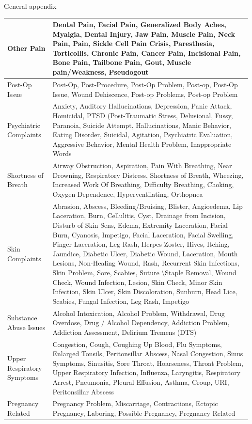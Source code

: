 \documentclass[,,nonblindrev]{informs}
\begin{document}
\begin{APPENDIX}{General appendix}
\begin{longtable}{|p{5cm}|p{12cm}|}
\hline
Other Pain & Dental Pain, Facial Pain, Generalized Body Aches, Myalgia, Dental Injury, Jaw Pain, Muscle Pain, Neck Pain, Pain, Sickle Cell Pain Crisis, Paresthesia, Torticollis, Chronic Pain, Cancer Pain, Incisional Pain, Bone Pain, Tailbone Pain, Gout, Muscle pain/Weakness, Pseudogout \\
\hline
Post-Op Issue & Post-Op, Post-Procedure, Post-Op Problem, Post-op, Post-Op Issue, Wound Dehiscence, Post-op Problems, Post-op Problem \\
\hline
Psychiatric Complaints & Anxiety, Auditory Hallucinations, Depression, Panic Attack, Homicidal, PTSD (Post-Traumatic Stress, Delusional, Fussy, Paranoia, Suicide Attempt, Hallucinations, Manic Behavior, Eating Disorder, Suicidal, Agitation, Psychiatric Evaluation, Aggressive Behavior, Mental Health Problem, Inappropriate Words \\
\hline
Shortness of Breath & Airway Obstruction, Aspiration, Pain With Breathing, Near Drowning, Respiratory Distress, Shortness of Breath, Wheezing, Increased Work Of Breathing, Difficulty Breathing, Choking, Oxygen Dependence, Hyperventilating, Orthopnea \\
\hline
Skin Complaints & Abrasion, Abscess, Bleeding/Bruising, Blister, Angioedema, Lip Laceration, Burn, Cellulitis, Cyst, Drainage from Incision, Disturb of Skin Sens, Edema, Extremity Laceration, Facial Burn, Cyanosis, Impetigo, Facial Laceration, Facial Swelling, Finger Laceration, Leg Rash, Herpes Zoster, Hives, Itching, Jaundice, Diabetic Ulcer, Diabetic Wound, Laceration, Mouth Lesions, Non-Healing Wound, Rash, Recurrent Skin Infections, Skin Problem, Sore, Scabies, Suture \textbackslash Staple Removal, Wound Check, Wound Infection, Lesion, Skin Check, Minor Skin Infection, Skin Ulcer, Skin Discoloration, Sunburn, Head Lice, Scabies, Fungal Infection, Leg Rash, Impetigo \\
\hline
Substance Abuse Issues & Alcohol Intoxication, Alcohol Problem, Withdrawal, Drug Overdose, Drug / Alcohol Dependency, Addiction Problem, Addiction Assessment, Delirium Tremens (DTS) \\
\hline
Upper Respiratory Symptoms & Congestion, Cough, Coughing Up Blood, Flu Symptoms, Enlarged Tonsils, Peritonsillar Abscess, Nasal Congestion, Sinus Symptoms, Sinusitis, Sore Throat, Hoarseness, Throat Problem, Upper Respiratory Infection, Influenza, Laryngitis, Respiratory Arrest, Pneumonia, Pleural Effusion, Asthma, Croup, URI, Peritonsillar Abscess \\
\hline
Pregnancy Related & Pregnancy Problem, Miscarriage, Contractions, Ectopic Pregnancy, Laboring, Possible Pregnancy, Pregnancy Related \\

\end{longtable}
\end{APPENDIX}
\end{document}
